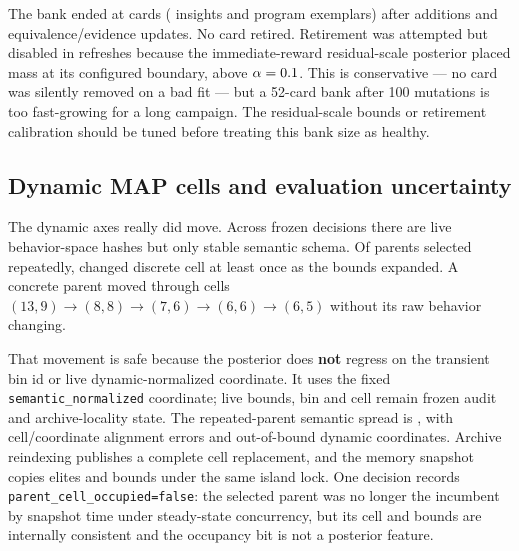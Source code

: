 \documentclass[11pt]{article}
\begin{document}
\begin{table}[H]\centering\small

\caption{Representative active cards. ``Cited'' means the structured mutation explicitly
returned the delivered id; its gain is descriptive post-treatment evidence, not a
card-level randomized effect. Sparse arms are why no per-card causal contrast is printed.
The enriched-neighbourhood card produced two closely replicated gains of approximately
0.0066 and 0.0062, while the out-of-fold kNN and K-means cards each produced useful
low-fitness children.}
\end{table}

The bank ended at \memCards{} cards (\memInsightCards{} insights and
\memProgramCards{} program exemplars) after \memCardAdds{} additions and
\memCardUpdates{} equivalence/evidence updates. No card retired. Retirement was attempted
but disabled in \memRetirementSweeps{} refreshes because the immediate-reward residual-scale
posterior placed \memBoundaryMass{} mass at its configured boundary, above
$\alpha=0.1{}$. This is conservative --- no card was silently removed on a
bad fit --- but a 52-card bank after 100 mutations is too fast-growing for a long campaign.
The residual-scale bounds or retirement calibration should be tuned before treating this
bank size as healthy.

\subsection{Dynamic MAP cells and evaluation uncertainty}

The dynamic axes really did move. Across \memDecisions{} frozen decisions there are
\memDynamicSchemas{} live behavior-space hashes but only \memSemanticSchemas{} stable
semantic schema. Of \memRepeatedParents{} parents selected repeatedly,
\memMovedParents{} changed discrete cell at least once as the bounds expanded. A concrete
parent moved through cells $(13,9)\to(8,8)\to(7,6)\to(6,6)\to(6,5)$ without its raw behavior
changing.

That movement is safe because the posterior does \textbf{not} regress on the transient bin
id or live dynamic-normalized coordinate. It uses the fixed
\texttt{semantic\_normalized} coordinate; live bounds, bin and cell remain frozen audit and
archive-locality state. The repeated-parent semantic spread is \memSemanticSpread{}, with
\memCellErrors{} cell/coordinate alignment errors and \memCoordinateErrors{} out-of-bound
dynamic coordinates. Archive reindexing publishes a complete cell replacement, and the
memory snapshot copies elites and bounds under the same island lock. One decision records
\texttt{parent\_cell\_occupied=false}: the selected parent was no longer the incumbent by
snapshot time under steady-state concurrency, but its cell and bounds are internally
consistent and the occupancy bit is not a posterior feature.
\end{document}
